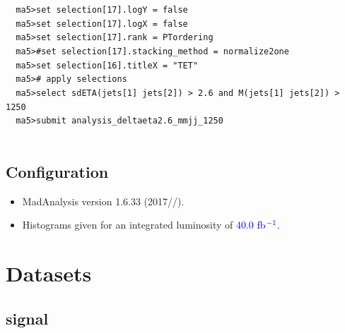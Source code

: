 \documentclass[a4paper, 10pt]{article}
\begin{document}
\texttt{ }\texttt{ }\texttt{ma5>set selection[17].logY = false\\
}
\texttt{ }\texttt{ }\texttt{ma5>set selection[17].logX = false\\
}
\texttt{ }\texttt{ }\texttt{ma5>set selection[17].rank = PTordering\\
}
\texttt{ }\texttt{ }\texttt{ma5>\#set selection[17].stacking\_method = normalize2one\\
}
\texttt{ }\texttt{ }\texttt{ma5>set selection[16].titleX = "TET"\\
}
\texttt{ }\texttt{ }\texttt{ma5>\# apply selections\\
}
\texttt{ }\texttt{ }\texttt{ma5>select sdETA(jets[1] jets[2]) > 2.6 and M(jets[1] jets[2]) > 1250\\
}
\texttt{ }\texttt{ }\texttt{ma5>submit analysis\_deltaeta2.6\_mmjj\_1250\\
}
\texttt{ }\texttt{ }\subsection{ Configuration}

\begin{itemize}
  \item MadAnalysis version 1.6.33 (2017//).
   \item Histograms given for an integrated luminosity of \textcolor{blue}{40.0}\textcolor{blue}{ fb}$^{\textcolor{blue}{-1}}$\textcolor{blue}{.}
\textcolor{blue}{}
\end{itemize}
\newpage
\section{ Datasets}

\subsection{ signal}
\end{document}
